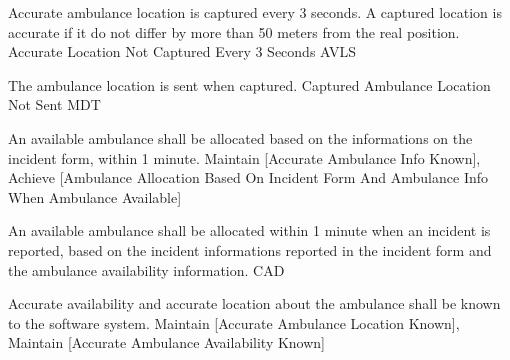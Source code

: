   \startkaosspec
  	 {Accurate ambulance location is captured every 3 seconds. A captured location is accurate if it do not differ by more than 50 meters from the real position.}
  	 {Accurate Location Not Captured Every 3 Seconds}
  	 {AVLS}
  \stopkaosspec

  \startkaosspec
  	 {The ambulance location is sent when captured.}
  	 {Captured Ambulance Location Not Sent}
  	 {MDT}
  \stopkaosspec
  
  
    {}

  \startkaosspec
  	 {An available ambulance shall be allocated based on the informations on the incident form, within 1 minute.}
  	 {Maintain [Accurate Ambulance Info Known], Achieve [Ambulance Allocation Based On Incident Form And Ambulance Info When Ambulance Available]}
  \stopkaosspec

  \startkaosspec
  	 {An available ambulance shall be allocated within 1 minute when an incident is reported, based on the incident informations reported in the incident form and the ambulance availability information.}
  	 {CAD}
  \stopkaosspec

  \startkaosspec
  	 {Accurate availability and accurate location about the ambulance shall be known to the software system.}
  	 {Maintain [Accurate Ambulance Location Known], Maintain [Accurate Ambulance Availability Known]}
  \stopkaosspec

  
    {}

